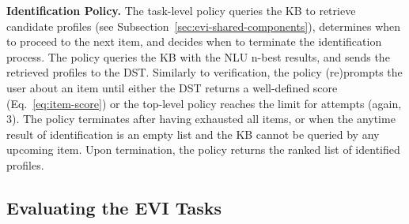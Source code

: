 \documentclass[11pt]{article}
\newcommand{\rparagraph}[1]{\vspace{1.4mm}\noindent\textbf{#1.}}
\begin{document}
{\rparagraph{Identification Policy}
The task-level policy
queries the KB to retrieve candidate profiles
(see Subsection~\ref{sec:evi-shared-components}),
determines when to proceed to the next item,
and decides when to terminate the identification process.
The policy queries the KB with the NLU n-best results,
and sends the retrieved profiles to the DST.
Similarly to verification,
the policy
(re)prompts the user about an item
until
either the DST returns a well-defined score (Eq.~\ref{eq:item-score})
or the top-level policy reaches the limit for attempts
(again, $3$).
The policy terminates
after having exhausted all items,
or when the anytime result of identification is an empty list
and the KB cannot be queried by any upcoming item.
Upon termination, 
the policy returns the ranked list of identified profiles.







\subsection{Evaluating the EVI Tasks}
\label{sec:evaluation}

}
\end{document}
